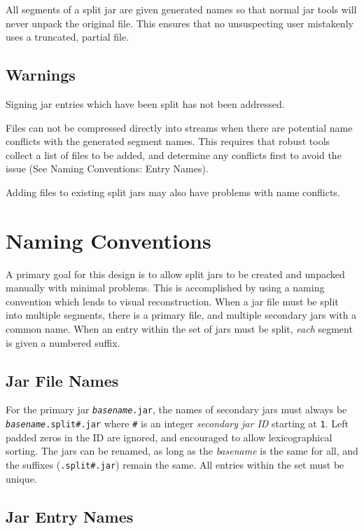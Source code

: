 \documentclass[a4paper, 12pt, pdftex]{report}
\begin{document}
All segments of a split jar are given generated names so that normal
jar tools will never unpack the original file. This ensures that no
unsuspecting user mistakenly uses a truncated, partial file.

\subsection{Warnings}

Signing jar entries which have been split has not been addressed.

Files can not be compressed directly into streams when there are
potential name conflicts with the generated segment names. This
requires that robust tools collect a list of files to be added, and
determine any conflicts first to avoid the issue (See Naming
Conventions: Entry Names).

Adding files to existing split jars may also have problems with name
conflicts.

\section{Naming Conventions}

A primary goal for this design is to allow split jars to be created
and unpacked manually with minimal problems. This is accomplished by
using a naming convention which lends to visual reconstruction. When a
jar file must be split into multiple segments, there is a primary
file, and multiple secondary jars with a common name. When an entry
within the set of jars must be split, \emph{each} segment is given
a numbered suffix.

\subsection{Jar File Names}

For the primary jar \texttt{\emph{basename}.jar}, the names of
secondary jars must always be \texttt{\emph{basename}.split\#.jar}
where \texttt{\#} is an integer \emph{secondary jar ID} starting at
\texttt{1}. Left padded zeros in the ID are ignored, and encouraged
to allow lexicographical sorting. The jars can be renamed, as long as
the \emph{basename} is the same for all, and the suffixes
(\texttt{.split\#.jar}) remain the same. All entries within the set
must be unique.

\subsection{Jar Entry Names}
\end{document}
